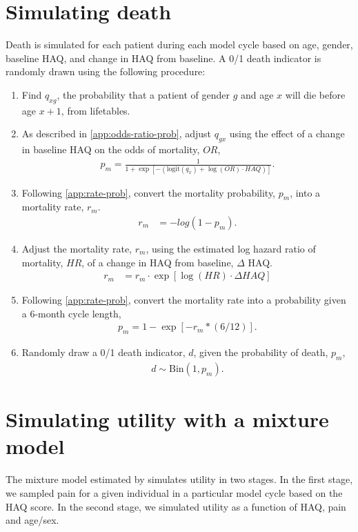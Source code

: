 \documentclass[11pt,final,fleqn]{article}\usepackage[]{graphicx}\usepackage[]{color}
\theoremstyle{plain}
\begin{document}
\begin{appendices}
\section{Simulating death}\label{ssec:simulating-death}
Death is simulated for each patient during each model cycle based on age, gender, baseline HAQ, and change in HAQ from baseline. A 0/1 death indicator is randomly drawn using the following procedure: 
\begin{enumerate}
\item Find $q_{xg}$, the probability that a patient of gender $g$ and age $x$ will die before age $x+1$, from lifetables.
\item As described in \autoref{app:odds-ratio-prob}, adjust $q_{gx}$ using the effect of a change in baseline HAQ on the odds of mortality, $OR$,
\begin{align}
p_m = \frac{1}{1 + \exp{\left[-(\text{logit}(q_x) + \log(OR)\cdot HAQ)\right]}}.
\end{align}
\item Following \autoref{app:rate-prob}, convert the mortality probability, $p_m$, into a mortality rate, $r_m$.
\begin{align}
r_m &= -log(1 - p_m).
\end{align}
\item Adjust the mortality rate, $r_m$, using the estimated log hazard ratio of mortality, $HR$, of a change in HAQ from baseline, $\Delta$ HAQ.
\begin{align}
r_m &= r_m \cdot \exp[\log(HR) \cdot \Delta HAQ]
\end{align}
\item Following \autoref{app:rate-prob}, convert the mortality rate into a probability given a 6-month cycle length,
\begin{align}
p_m = 1 - \exp[-r_m * (6/12)].
\end{align}
\item Randomly draw a 0/1 death indicator, $d$, given the probability of death, $p_m$,
\begin{align}
d \sim \text{Bin}(1, p_m).
\end{align}
\end{enumerate}

\section{Simulating utility with a mixture model}\label{app:sim-utility-mixture}
The mixture model estimated by \citet{alava2013relationship} simulates utility in two stages. In the first stage, we sampled pain for a given individual in a particular model cycle based on the HAQ score. In the second stage, we simulated utility as a function of HAQ, pain and age/sex.


\end{appendices}
\end{document}
